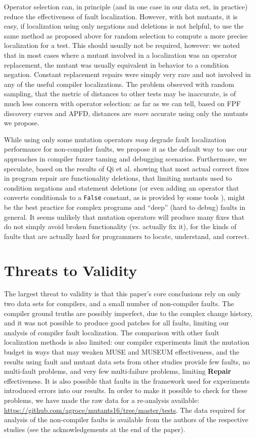 Operator selection can, in principle (and in one case in our data set, in practice) reduce the effectiveness of fault localization.  However, with hot mutants, it is easy, if localization using only negations and deletions is not helpful, to use the same method as proposed above for random selection to compute a more precise localization for a test.  This should usually not be required, however:  we noted that in most cases where a mutant involved in a localization was an operator replacement, the mutant was usually equivalent in behavior to a condition negation.  Constant replacement repairs were simply very rare and not involved in any of the useful compiler localizations.  The problem observed with random sampling, that the metric of distances to other tests may be inaccurate, is of much less concern with operator selection:  as far as we can tell, based on FPF discovery curves and APFD, distances are \emph{more} accurate using only the mutants we propose.

While using only some mutation operators \emph{may} degrade fault localization performance for non-compiler faults, we propose it as the default way to use our approaches in compiler fuzzer taming  and debugging scenarios.  Furthermore, we speculate, based on the results of Qi et al. \cite{achour} showing that most actual correct fixes in program repair are functionality deletions, that limiting mutants used to condition negations and statement deletions (or even adding an operator that converts conditionals to a {\tt False} constant, as is provided by some tools \cite{RegExpMut}), might be the best practice for complex programs and ``deep'' (hard to debug) faults in general.  It seems unlikely that mutation operators will produce many fixes that do not simply avoid broken functionality (vs. actually fix it), for the kinds of faults that are actually hard for programmers to locate, understand, and correct.

\section{Threats to Validity}

The largest threat to validity is that this paper's core conclusions rely on only two data sets for compilers, and a small number of non-compiler faults.  The compiler ground truths are possibly imperfect, due to the complex change history, and it was not possible to produce good patches for all faults, limiting our analysis of compiler fault localization.    The comparison with other fault localization methods is also limited:  our compiler experiments limit the mutation budget in ways that may weaken MUSE and MUSEUM effectiveness, and the results using fault and mutant data sets from other studies provide few faults, no multi-fault problems, and very few multi-failure problems, limiting {\bf Repair} effectiveness.   It is also possible that faults in the framework used for experiments introduced errors into our results.  In order to make it possible to check for these problems, we have made the raw data for a re-analysis available: \url{https://github.com/agroce/mutants16/tree/master/tests}.  The data required for analysis of the non-compiler faults is available from the authors of the respective studies (see the acknowledgements at the end of the paper).
